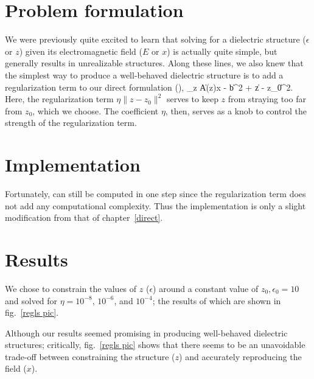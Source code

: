 \section{Problem formulation}
We were previously quite excited to learn that solving for 
    a dielectric structure ($\epsilon$ or $z$) given 
    its electromagnetic field ($E$ or $x$) is actually quite simple,
    but generally results in unrealizable structures.
Along these lines, we also knew that the simplest way 
    to produce a well-behaved dielectric structure is 
    to add a regularization term to our direct formulation (),
    \BE \minimize_z \|A(z)x - b\|^2 + \eta \|z - z_0\|^2. \label{reg:problem}\EE
Here, the regularization term $\eta \|z - z_0\|^2$
    serves to keep $z$ from straying too far from $z_0$, which we choose.
The coefficient $\eta$, then, serves as a knob to control the
    strength of the regularization term.

\section{Implementation}
Fortunately,  can still be computed in one step
    since the regularization term does not add any computational complexity.
Thus the implementation is only a slight modification
    from that of chapter~\ref{direct}.

\section{Results}
We chose to constrain the values of $z$ ($\epsilon$) 
    around a constant value of $z_0, \epsilon_0 = 10$ and 
    solved  for $\eta=10^{-8}$, $10^{-6}$, and $10^{-4}$;
    the results of which are shown in fig.~\ref{regls pic}\cite{Lu10}.
    
Although our results seemed promising in producing well-behaved
    dielectric structures;
    critically, fig.~\ref{regls pic} shows that there seems
    to be an unavoidable trade-off between 
    constraining the structure ($z$) 
    and accurately reproducing the field ($x$).

